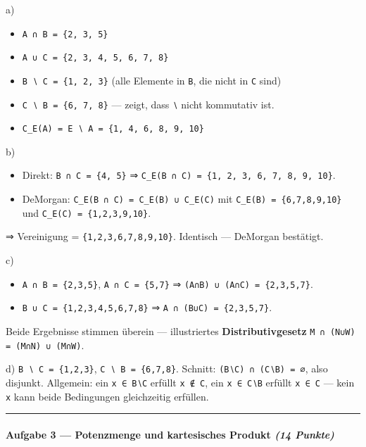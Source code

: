 \documentclass[11pt, a4paper]{article}
\begin{document}
a)

\begin{itemize}
  \item \texttt{A ∩ B = \{2, 3, 5\}}
  \item \texttt{A ∪ C = \{2, 3, 4, 5, 6, 7, 8\}}
  \item \texttt{B ∖ C = \{1, 2, 3\}} (alle Elemente in \texttt{B}, die nicht in \texttt{C} sind)
  \item \texttt{C ∖ B = \{6, 7, 8\}} — zeigt, dass \texttt{∖} nicht kommutativ ist.
  \item \texttt{C\_E(A) = E ∖ A = \{1, 4, 6, 8, 9, 10\}}
\end{itemize}

b)

\begin{itemize}
  \item Direkt: \texttt{B ∩ C = \{4, 5\}} ⇒ \texttt{C\_E(B ∩ C) = \{1, 2, 3, 6, 7, 8, 9, 10\}}.
  \item DeMorgan: \texttt{C\_E(B ∩ C) = C\_E(B) ∪ C\_E(C)} mit \texttt{C\_E(B) = \{6,7,8,9,10\}} und \texttt{C\_E(C) = \{1,2,3,9,10\}}.
\end{itemize}
⇒ Vereinigung = \texttt{\{1,2,3,6,7,8,9,10\}}. Identisch — DeMorgan bestätigt.


c)

\begin{itemize}
  \item \texttt{A ∩ B = \{2,3,5\}}, \texttt{A ∩ C = \{5,7\}} ⇒ \texttt{(A∩B) ∪ (A∩C) = \{2,3,5,7\}}.
  \item \texttt{B ∪ C = \{1,2,3,4,5,6,7,8\}} ⇒ \texttt{A ∩ (B∪C) = \{2,3,5,7\}}.
\end{itemize}

Beide Ergebnisse stimmen überein — illustriertes \textbf{Distributivgesetz} \texttt{M ∩ (N∪W) = (M∩N) ∪ (M∩W)}.


d) \texttt{B ∖ C = \{1,2,3\}}, \texttt{C ∖ B = \{6,7,8\}}. Schnitt: \texttt{(B∖C) ∩ (C∖B) = ∅}, also disjunkt. Allgemein: ein \texttt{x ∈ B∖C} erfüllt \texttt{x ∉ C}, ein \texttt{x ∈ C∖B} erfüllt \texttt{x ∈ C} — kein \texttt{x} kann beide Bedingungen gleichzeitig erfüllen.



\noindent\textcolor{rulegray}{\rule{\linewidth}{0.4pt}}


\paragraph{Aufgabe 3 — Potenzmenge und kartesisches Produkt \textit{(14 Punkte)}}\mbox{}\\[2pt]
\end{document}
